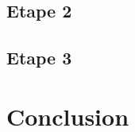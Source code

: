 \documentclass[a4paper]{article}
\begin{document}
    \subsection{Etape 2}
    \subsection{Etape 3}

\section{Conclusion} %
\begin{lstlisting}[style=CStyle]
    
\end{lstlisting}

\newpage %
\listoftodos
\end{document}
